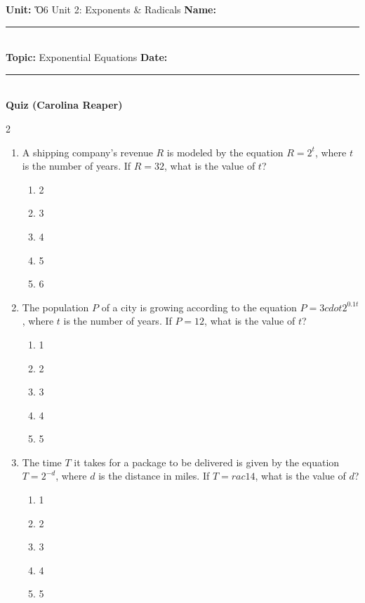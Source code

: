 \documentclass[10pt]{article}
\begin{document}
\enlargethispage{2.5cm}

\begin{tcolorbox}[colback=mainblue!5, colframe=mainblue, sharp corners, boxrule=0.5pt]
    \small \textbf{Unit:} Ὅ6 Unit 2: Exponents & Radicals \hfill \textbf{Name:} \rule{3cm}{0.4pt} \\
    \small \textbf{Topic:} Exponential Equations \hfill \textbf{Date:} \rule{2cm}{0.4pt} \\
    \centering \textbf{\large Quiz (Carolina Reaper)}
\end{tcolorbox}

\vspace{0.2cm}

\begin{multicols}{2}
\begin{enumerate}[label=\textbf{Q\arabic*.}, leftmargin=*, itemsep=6pt, parsep=0pt]

  \item \small A shipping company's revenue $R$ is modeled by the equation $R = 2^t$, where $t$ is the number of years. If $R = 32$, what is the value of $t$?
  \begin{enumerate}[label=(\Alph*), leftmargin=0.6cm, nosep, itemsep=2pt]
    \item 2
    \item 3
    \item 4
    \item 5
    \item 6
  \end{enumerate}

  \item \small The population $P$ of a city is growing according to the equation $P = 3 cdot 2^{0.1t}$, where $t$ is the number of years. If $P = 12$, what is the value of $t$?
  \begin{enumerate}[label=(\Alph*), leftmargin=0.6cm, nosep, itemsep=2pt]
    \item 1
    \item 2
    \item 3
    \item 4
    \item 5
  \end{enumerate}

  \item \small The time $T$ it takes for a package to be delivered is given by the equation $T = 2^{-d}$, where $d$ is the distance in miles. If $T = rac{1}{4}$, what is the value of $d$?
  \begin{enumerate}[label=(\Alph*), leftmargin=0.6cm, nosep, itemsep=2pt]
    \item 1
    \item 2
    \item 3
    \item 4
    \item 5
  \end{enumerate}


\end{enumerate}
\end{multicols}
\end{document}
